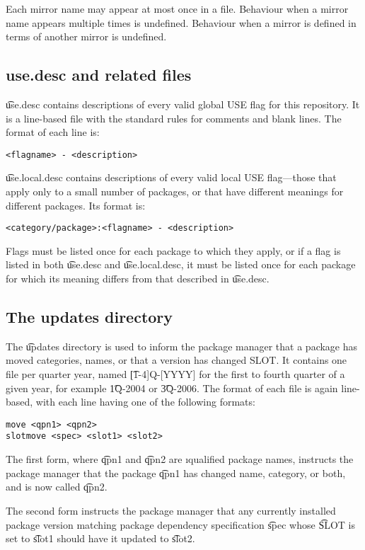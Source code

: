 Each mirror name may appear at most once in a file. Behaviour when a mirror name appears multiple
times is undefined. Behaviour when a mirror is defined in terms of another mirror is undefined.

\subsection{use.desc and related files}
\label{use.desc}
\t{use.desc} contains descriptions of every valid global USE flag for this repository. It is a
line-based file with the standard rules for comments and blank lines. The format of each line is:
\begin{verbatim}
<flagname> - <description>
\end{verbatim}

\t{use.local.desc} contains descriptions of every valid local USE flag---those that apply only to a
small number of packages, or that have different meanings for different packages. Its format is:
\begin{verbatim}
<category/package>:<flagname> - <description>
\end{verbatim}
Flags must be listed once for each package to which they apply, or if a flag is listed in both
\t{use.desc} and \t{use.local.desc}, it must be listed once for each package for which its meaning
differs from that described in \t{use.desc}.

\subsection{The updates directory}
\label{updates-dir}
The \t{updates} directory is used to inform the package manager that a package has moved categories,
names, or that a version has changed SLOT. It contains one file per quarter year, named
\t{[1-4]Q-[YYYY]} for the first to fourth quarter of a given year, for example \t{1Q-2004} or
\t{3Q-2006}. The format of each file is again line-based, with each line having one of the following
formats:
\begin{verbatim}
move <qpn1> <qpn2>
slotmove <spec> <slot1> <slot2>
\end{verbatim}
The first form, where \t{qpn1} and \t{qpn2} are \i{qualified package names}, instructs the package
manager that the package \t{qpn1} has changed name, category, or both, and is now called \t{qpn2}.

The second form instructs the package manager that any currently installed package version matching
package dependency specification \t{spec} whose \t{SLOT} is set to \t{slot1} should have it updated
to \t{slot2}.


